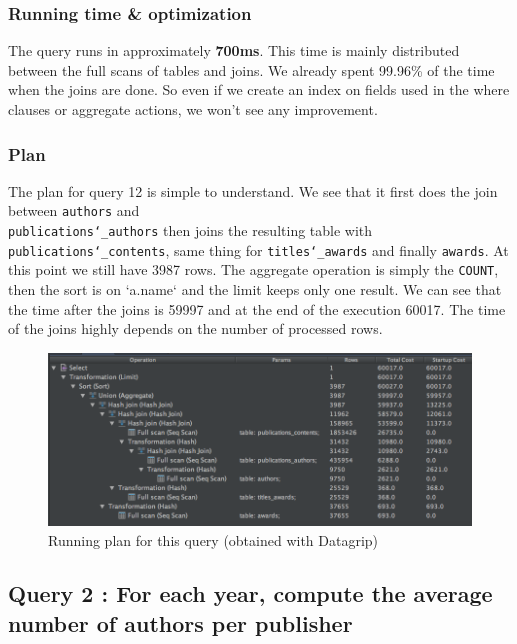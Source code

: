 \documentclass[doubleside, titlepage]{article}
\begin{document}
\subsubsection{Running time \& optimization}

The query runs in approximately \textbf{700ms}. This time is mainly distributed between the full scans of tables and joins. We already spent 99.96\% of the time when the joins are done. So even if we create an index on fields used in the where clauses or aggregate actions, we won't see any improvement.

\subsubsection{Plan}
The plan for query 12 is simple to understand. We see that it first does the join between \texttt{authors} and ~\\ \texttt{publications\char`_authors} then joins the resulting table with \texttt{publications\char`_contents}, same thing for \texttt{titles\char`_awards} and finally \texttt{awards}. At this point we still have 3987 rows. The aggregate operation is simply the \texttt{COUNT}, then the sort is on `a.name` and the limit keeps only one result.
We can see that the time after the joins is 59997 and at the end of the execution 60017. The time of the joins highly depends on the number of processed rows.

\begin{figure}[!htb]
	\centering
    \includegraphics[scale = 0.5]{./query_analysis/query12}
    \caption{Running plan for this query (obtained with Datagrip)}
\end{figure}

\newpage

\subsection{Query 2 : For each year, compute the average number of authors per publisher}
\end{document}
